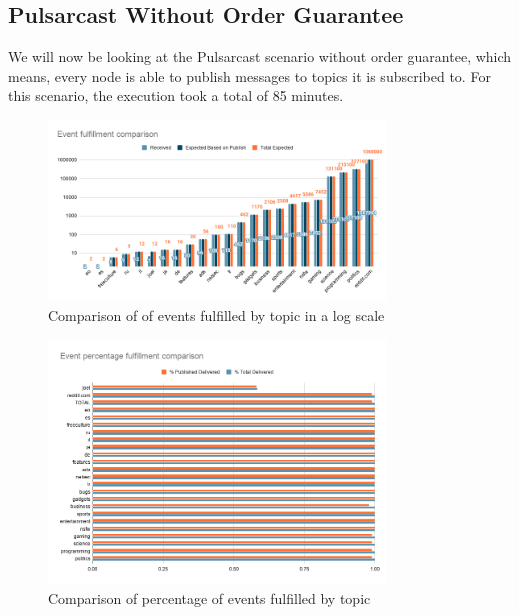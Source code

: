 \subsection{Pulsarcast Without Order Guarantee}\label{subsec:pulsarcast-without-order-guarantee}

We will now be looking at the Pulsarcast scenario without order guarantee,
which means, every node is able to publish messages to topics it is subscribed
to. For this scenario, the execution took a total of 85 minutes.

\begin{figure}[!htb]
  \centering
  \includegraphics[width=0.8\textwidth]{img/graph-pulsarcast-event-fulfillment-comparison.png}
  \caption{Comparison of of events fulfilled by topic in a log scale}
  \label{fig:graph-pulsarcast-event-fulfillment-comparison}
\end{figure}

\begin{figure}[!htb]
  \centering
  \includegraphics[width=0.8\textwidth]{img/graph-pulsarcast-event-percentage-fulfillment-comparison.png}
  \caption{Comparison of percentage of events fulfilled by topic}
  \label{fig:graph-pulsarcast-event-percentage-fulfillment-comparison}
\end{figure}

